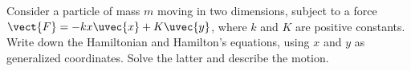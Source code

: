 \documentclass[../main.tex]{subfiles}
\begin{document}
\begin{problema}
	Consider a particle of mass \(m\) moving in two dimensions, subject
	to a force \(\vect{F} = -kx \uvec{x} + K \uvec{y}\), where \(k\)
	and \(K\) are positive constants. Write down the Hamiltonian and
	Hamilton's equations, using \(x\) and \(y\) as generalized
	coordinates. Solve the latter and describe the motion.
\end{problema}
\end{document}
